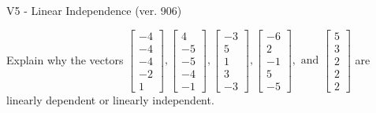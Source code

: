 \begin{exercise}
  \begin{exerciseTitle}V5 - Linear Independence (ver. 906)\end{exerciseTitle}
  \begin{exerciseStatement}
    Explain why the vectors \(\left[\begin{array}{r}
-4 \\
-4 \\
-4 \\
-2 \\
1
\end{array}\right] , \left[\begin{array}{r}
4 \\
-5 \\
-5 \\
-4 \\
-1
\end{array}\right] , \left[\begin{array}{r}
-3 \\
5 \\
1 \\
3 \\
-3
\end{array}\right] , \left[\begin{array}{r}
-6 \\
2 \\
-1 \\
5 \\
-5
\end{array}\right] , \text{ and } \left[\begin{array}{r}
5 \\
3 \\
2 \\
2 \\
2
\end{array}\right]\) are linearly dependent or linearly independent.	



\end{exerciseStatement}
\end{exercise}
